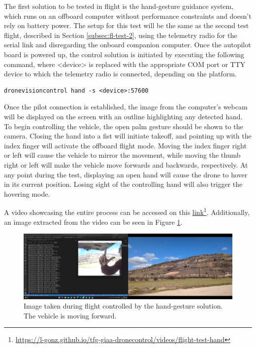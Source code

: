 The first solution to be tested in flight is the hand-gesture guidance system, which runs on an offboard computer without performance constraints and doesn't rely on battery power. The setup for this test will be the same as the second test flight, described in Section \ref{subsec:fl-test-2}, using the telemetry radio for the serial link and disregarding the onboard companion computer. Once the autopilot board is powered up, the control solution is initiated by executing the following command, where <device> is replaced with the appropriate COM port or TTY device to which the telemetry radio is connected, depending on the platform.
\begin{verbatim}
dronevisioncontrol hand -s <device>:57600
\end{verbatim}


Once the pilot connection is established, the image from the computer's webcam will be displayed on the screen with an outline highlighting any detected hand. To begin controlling the vehicle, the open palm gesture should be shown to the camera. Closing the hand into a fist will initiate takeoff, and pointing up with the index finger will activate the offboard flight mode. Moving the index finger right or left will cause the vehicle to mirror the movement, while moving the thumb right or left will make the vehicle move forwards and backwards, respectively. At any point during the test, displaying an open hand will cause the drone to hover in its current position. Losing sight of the controlling hand will also trigger the hovering mode.


A video showcasing the entire process can be accessed on this \href{https://l-gonz.github.io/tfg-giaa-dronecontrol/videos/flight-test-hand}{link}\footnote{\url{https://l-gonz.github.io/tfg-giaa-dronecontrol/videos/flight-test-hand}}. Additionally, an image extracted from the video can be seen in Figure \ref{fig:flight-test-hand}.

\begin{figure}[H]
  \centering
  \includegraphics[width=\textwidth, keepaspectratio]{img/video-field-test-hand.png}
  \caption{Image taken during flight controlled by the hand-gesture solution. The vehicle is moving forward.}
  \label{fig:flight-test-hand}
\end{figure}


